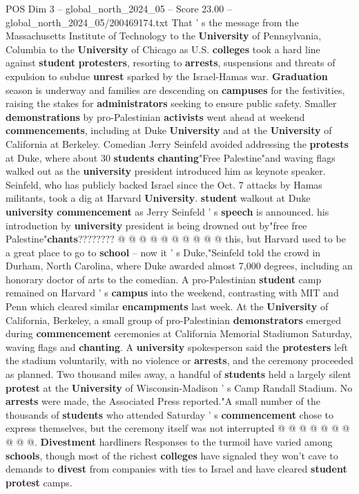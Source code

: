 \begin{textsample}{POS Dim 3 – global\_north\_2024\_05 – Score 23.00 – global\_north\_2024\_05/200469174.txt}  \label{ex:f3_pos_010}
That ' s the message from the Massachusetts Institute of Technology to the \textbf{University} of Pennsylvania, Columbia to the \textbf{University} of Chicago as U.S. \textbf{colleges} took a hard line against \textbf{student} \textbf{protesters}, resorting to \textbf{arrests}, suspensions and threats of expulsion to subdue \textbf{unrest} sparked by the Israel-Hamas war. \textbf{Graduation} season is underway and families are descending on \textbf{campuses} for the festivities, raising the stakes for \textbf{administrators} seeking to ensure public safety.
Smaller \textbf{demonstrations} by pro-Palestinian \textbf{activists} went ahead at weekend \textbf{commencements}, including at Duke \textbf{University} and at the \textbf{University} of California at Berkeley.
Comedian Jerry Seinfeld avoided addressing the \textbf{protests} at Duke, where about 30 \textbf{students} \textbf{chanting}"Free Palestine"and waving flags walked out as the \textbf{university} president introduced him as keynote speaker.
Seinfeld, who has publicly backed Israel since the Oct. 7 attacks by Hamas militants, took a dig at Harvard \textbf{University}. \textbf{student} walkout at Duke \textbf{university} \textbf{commencement} as Jerry Seinfeld ' s \textbf{speech} is announced. his introduction by \textbf{university} president is being drowned out by"free free Palestine"\textbf{chants}???????? @ @ @ @ @ @ @ @ @ @ this, but Harvard used to be a great place to go to \textbf{school} -- now it ' s Duke,"Seinfeld told the crowd in Durham, North Carolina, where Duke awarded almost 7,000 degrees, including an honorary doctor of arts to the comedian.
A pro-Palestinian \textbf{student} camp remained on Harvard ' s \textbf{campus} into the weekend, contrasting with MIT and Penn which cleared similar \textbf{encampments} last week.
At the \textbf{University} of California, Berkeley, a small group of pro-Palestinian \textbf{demonstrators} emerged during \textbf{commencement} ceremonies at California Memorial Stadiumon Saturday, waving flags and \textbf{chanting}.
A \textbf{university} spokesperson said the \textbf{protesters} left the stadium voluntarily, with no violence or \textbf{arrests}, and the ceremony proceeded as planned.
Two thousand miles away, a handful of \textbf{students} held a largely silent \textbf{protest} at the \textbf{University} of Wisconsin-Madison ' s Camp Randall Stadium.
No \textbf{arrests} were made, the Associated Press reported."A small number of the thousands of \textbf{students} who attended Saturday ' s \textbf{commencement} chose to express themselves, but the ceremony itself was not interrupted @ @ @ @ @ @ @ @ @ @. \textbf{Divestment} hardliners Responses to the turmoil have varied among \textbf{schools}, though most of the richest \textbf{colleges} have signaled they won't cave to demands to \textbf{divest} from companies with ties to Israel and have cleared \textbf{student} \textbf{protest} camps.

\end{textsample}
